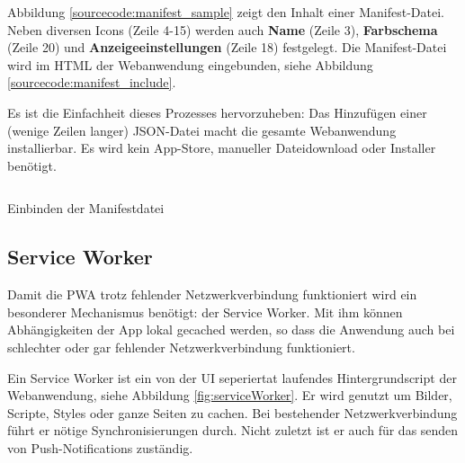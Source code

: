 
Abbildung \ref{sourcecode:manifest_sample} zeigt den Inhalt einer Manifest-Datei. Neben diversen Icons (Zeile 4-15) werden auch \textbf{Name} (Zeile 3), \textbf{Farbschema} (Zeile 20) und \textbf{Anzeigeeinstellungen} (Zeile 18) festgelegt.
Die Manifest-Datei wird im HTML der Webanwendung eingebunden, siehe Abbildung \ref{sourcecode:manifest_include}. 

Es ist die Einfachheit dieses Prozesses hervorzuheben: Das Hinzufügen einer (wenige Zeilen langer) JSON-Datei macht die gesamte Webanwendung installierbar. Es wird kein App-Store, manueller Dateidownload oder Installer benötigt. 

\begin{listing}[H]
    \inputminted{xml}{sourcecode/include_manifest.html}
    \caption{Einbinden der Manifestdatei}
      \label{sourcecode:manifest_include}
\end{listing}



\subsection{Service Worker}
\label{chap:service_worker}

Damit die PWA trotz fehlender Netzwerkverbindung funktioniert wird ein besonderer Mechanismus benötigt: der Service Worker. Mit ihm können Abhängigkeiten der App lokal gecached werden, so dass die Anwendung auch bei schlechter oder gar fehlender Netzwerkverbindung funktioniert. \cite[S. 7]{BeginningPWA}

Ein Service Worker ist ein von der UI seperiertat laufendes Hintergrundscript der Webanwendung, siehe Abbildung \ref{fig:serviceWorker}. Er wird genutzt um Bilder, Scripte, Styles oder ganze Seiten zu cachen. Bei bestehender Netzwerkverbindung führt er nötige Synchronisierungen durch. Nicht zuletzt ist er auch für das senden von Push-Notifications zuständig. \cite[S. 24]{BeginningPWA}

